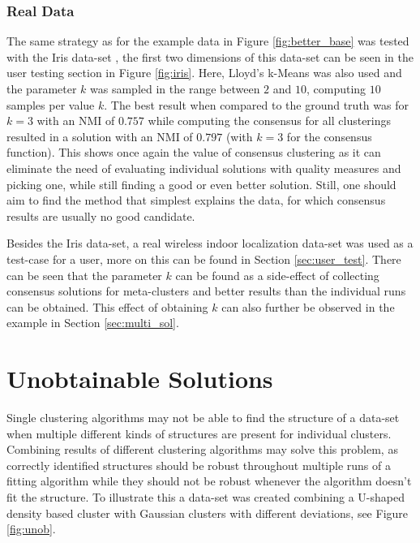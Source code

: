 \documentclass[
	a4paper,
	english,
	twoside,
	openright,               
	11pt                            
	]{report}
\begin{document}
\subsubsection{Real Data}

The same strategy as for the example data in Figure \ref{fig:better_base} was tested with the Iris data-set \cite{Dua:2019}, the first two dimensions of this data-set can be seen in the user testing section in Figure \ref{fig:iris}. Here, Lloyd's k-Means was also used and the parameter $k$ was sampled in the range between $2$ and $10$, computing $10$ samples per value $k$. The best result when compared to the ground truth was for $k=3$ with an NMI of $0.757$ while computing the consensus for all clusterings resulted in a solution with an NMI of $0.797$ (with $k=3$ for the consensus function). This shows once again the value of consensus clustering as it can eliminate the need of evaluating individual solutions with quality measures and picking one, while still finding a good or even better solution. Still, one should aim to find the method that simplest explains the data, for which consensus results are usually no good candidate. 

Besides the Iris data-set, a real wireless indoor localization data-set \cite{wireless} was used as a test-case for a user, more on this can be found in Section \ref{sec:user_test}. There can be seen that the parameter $k$ can be found as a side-effect of collecting consensus solutions for meta-clusters and better results than the individual runs can be obtained. This effect of obtaining $k$ can also further be observed in the example in Section \ref{sec:multi_sol}.

\section{Unobtainable Solutions}\label{sec:unob}
Single clustering algorithms may not be able to find the structure of a data-set when multiple different kinds of structures are present for individual clusters. Combining results of different clustering algorithms may solve this problem, as correctly identified structures should be robust throughout multiple runs of a fitting algorithm while they should not be robust whenever the algorithm doesn't fit the structure. To illustrate this a data-set was created combining a U-shaped density based cluster with Gaussian clusters with different deviations, see Figure \ref{fig:unob}.
\end{document}
